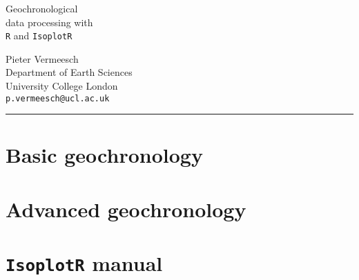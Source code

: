 \documentclass[11pt,openany]{book}
\begin{document}
\begin{titlepage}
  
  \parbox[t]{0.93\textwidth}{
    \parbox[t]{0.91\textwidth}{
      \raggedleft
      \fontsize{50pt}{80pt}
      \vspace{0.7cm}
      \Huge
      Geochronological\\
      data processing with\\
      \texttt{R} and \texttt{IsoplotR} \\
    }
  }

\vfill
  
  \parbox[t]{0.93\textwidth}{
    \raggedleft
    \large
        {\Large Pieter Vermeesch}\\[4pt]
        Department of Earth Sciences\\
        University College London\\[4pt]
        \texttt{p.vermeesch@ucl.ac.uk}\\
	
        \hfill\rule{0.2\linewidth}{1pt}
}
	
\end{titlepage}

\tableofcontents

\part{Basic geochronology}

































\part{Advanced geochronology}











\part{\texttt{IsoplotR} manual}


\end{document}
